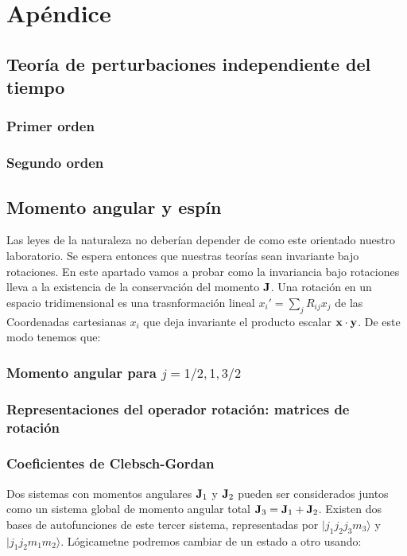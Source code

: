 \appendix 
\chapter{Apéndice} \label{Ch:Anex_A}

\section{Teoría de perturbaciones independiente del tiempo}

\subsection{Primer orden}

\subsection{Segundo orden}


\section{Momento angular y espín}

Las leyes de la naturaleza no deberían depender de como este orientado nuestro laboratorio. Se espera entonces que nuestras teorías sean invariante bajo rotaciones. En este apartado vamos a probar como la invariancia bajo rotaciones lleva a la existencia de la conservación del momento $\mathbf{J}$. Una rotación en un espacio tridimensional es una trasnformación lineal $x_i'=\sum_j R_{ij} x_j$ de las Coordenadas cartesianas  $x_i$ que deja invariante el producto escalar $\mathbf{x} \cdot \mathbf{y}$. De este modo tenemos que:

\subsection{Momento angular para $j=1/2,1,3/2$}

\subsection{Representaciones del operador rotación: matrices de rotación}


\subsection{Coeficientes de Clebsch-Gordan}

Dos sistemas con momentos angulares $\mathbf{J}_1$ y $\mathbf{J}_2$ pueden ser considerados juntos como un sistema global de momento angular total $\mathbf{J}_3 = \mathbf{J}_1 + \mathbf{J}_2$. Existen dos bases de autofunciones de este tercer sistema, representadas por $|j_1 j_2 j_3 m_3\rangle$ y $|j_1 j_2 m_1 m_2\rangle$. Lógicametne podremos cambiar de un estado a otro usando:

